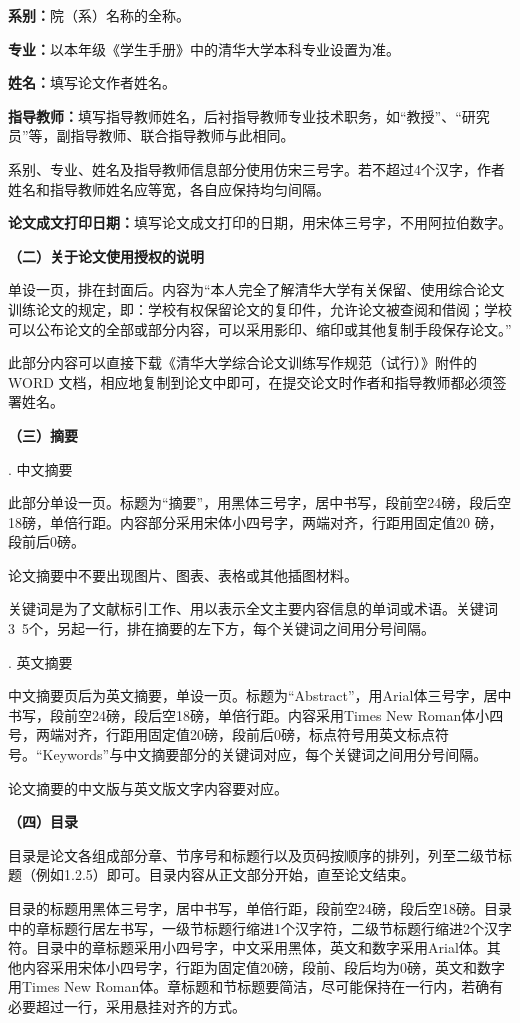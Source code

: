 \documentclass{Diploma}
\begin{document}
\textbf{系别：}院（系）名称的全称。

\textbf{专业：}以本年级《学生手册》中的清华大学本科专业设置为准。

\textbf{姓名：}填写论文作者姓名。

\textbf{指导教师：}填写指导教师姓名，后衬指导教师专业技术职务，如“教授”、“研究员”等，副指导教师、联合指导教师与此相同。

系别、专业、姓名及指导教师信息部分使用仿宋三号字。若不超过4个汉字，作者姓名和指导教师姓名应等宽，各自应保持均匀间隔。

\textbf{论文成文打印日期：}填写论文成文打印的日期，用宋体三号字，不用阿拉伯数字。

\noindent\textbf{（二）关于论文使用授权的说明}

单设一页，排在封面后。内容为“本人完全了解清华大学有关保留、使用综合论文训练论文的规定，即：学校有权保留论文的复印件，允许论文被查阅和借阅；学校可以公布论文的全部或部分内容，可以采用影印、缩印或其他复制手段保存论文。”

此部分内容可以直接下载《清华大学综合论文训练写作规范（试行）》附件的WORD 文档，相应地复制到论文中即可，在提交论文时作者和指导教师都必须签署姓名。

\noindent\textbf{（三）摘要}

. 中文摘要

此部分单设一页。标题为“摘要”，用黑体三号字，居中书写，段前空24磅，段后空18磅，单倍行距。内容部分采用宋体小四号字，两端对齐，行距用固定值20 磅，段前后0磅。

论文摘要中不要出现图片、图表、表格或其他插图材料。

关键词是为了文献标引工作、用以表示全文主要内容信息的单词或术语。关键词3~5个，另起一行，排在摘要的左下方，每个关键词之间用分号间隔。

. 英文摘要

中文摘要页后为英文摘要，单设一页。标题为“Abstract”，用Arial体三号字，居中书写，段前空24磅，段后空18磅，单倍行距。内容采用Times New Roman体小四号，两端对齐，行距用固定值20磅，段前后0磅，标点符号用英文标点符号。“Keywords”与中文摘要部分的关键词对应，每个关键词之间用分号间隔。

论文摘要的中文版与英文版文字内容要对应。

\noindent\textbf{（四）目录}

目录是论文各组成部分章、节序号和标题行以及页码按顺序的排列，列至二级节标题（例如1.2.5）即可。目录内容从正文部分开始，直至论文结束。

目录的标题用黑体三号字，居中书写，单倍行距，段前空24磅，段后空18磅。目录中的章标题行居左书写，一级节标题行缩进1个汉字符，二级节标题行缩进2个汉字符。目录中的章标题采用小四号字，中文采用黑体，英文和数字采用Arial体。其他内容采用宋体小四号字，行距为固定值20磅，段前、段后均为0磅，英文和数字用Times New Roman体。章标题和节标题要简洁，尽可能保持在一行内，若确有必要超过一行，采用悬挂对齐的方式。
\end{document}
